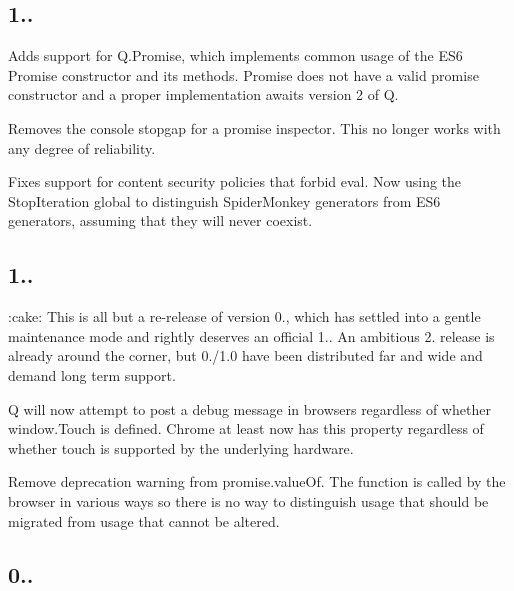\subsection*{1..}


\begin{DoxyItemize}
\item Adds support for {\ttfamily Q.\+Promise}, which implements common usage of the E\+S6 {\ttfamily Promise} constructor and its methods. {\ttfamily Promise} does not have a valid promise constructor and a proper implementation awaits version 2 of Q.
\item Removes the console stopgap for a promise inspector. This no longer works with any degree of reliability.
\item Fixes support for content security policies that forbid eval. Now using the {\ttfamily Stop\+Iteration} global to distinguish Spider\+Monkey generators from E\+S6 generators, assuming that they will never coexist.
\end{DoxyItemize}

\subsection*{1..}

\+:cake\+: This is all but a re-\/release of version 0., which has settled into a gentle maintenance mode and rightly deserves an official 1.. An ambitious 2. release is already around the corner, but 0./1.0 have been distributed far and wide and demand long term support.


\begin{DoxyItemize}
\item Q will now attempt to post a debug message in browsers regardless of whether window.\+Touch is defined. Chrome at least now has this property regardless of whether touch is supported by the underlying hardware.
\item Remove deprecation warning from {\ttfamily promise.\+value\+Of}. The function is called by the browser in various ways so there is no way to distinguish usage that should be migrated from usage that cannot be altered.
\end{DoxyItemize}

\subsection*{0..}


